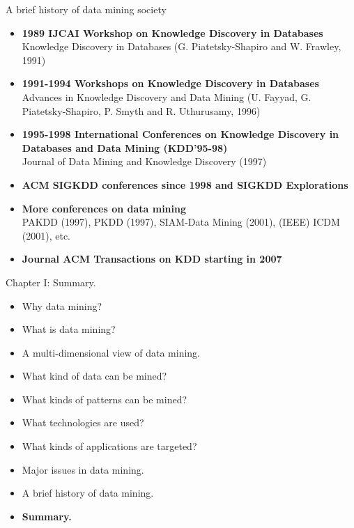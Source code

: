 \documentclass[aspectratio=169,t]{beamer}
\begin{document}
 { 
    \begin{frame}{A brief history of data mining society}
        \begin{itemize}
            \item \textbf{1989 IJCAI Workshop on Knowledge Discovery in Databases}\\
                  Knowledge Discovery in Databases (G. Piatetsky-Shapiro and W. Frawley, 1991)
            \item \textbf{1991-1994 Workshops on Knowledge Discovery in Databases}\\
                  Advances in Knowledge Discovery and Data Mining (U. Fayyad, G. Piatetsky-Shapiro, P. Smyth and R. Uthurusamy, 1996)
            \item \textbf{1995-1998 International Conferences on Knowledge Discovery in Databases and Data Mining (KDD’95-98)}\\
                  Journal of Data Mining and Knowledge Discovery (1997)
            \item \textbf{ACM SIGKDD conferences since 1998 and SIGKDD Explorations}\\
            \item \textbf{More conferences on data mining}\\
                  PAKDD (1997), PKDD (1997), SIAM-Data Mining (2001), (IEEE) ICDM (2001), etc.
            \item \textbf{Journal ACM Transactions on KDD starting in 2007}
        \end{itemize}
    \end{frame}
  }

 { 
    \begin{frame}{Chapter I: Summary.}
        \begin{itemize}
            \item Why data mining?
            \item What is data mining?
            \item A multi-dimensional view of data mining.
            \item What kind of data can be mined?
            \item What kinds of patterns can be mined?
            \item What technologies are used?
            \item What kinds of applications are targeted?
            \item Major issues in data mining.
            \item A brief history of data mining.
            \item \textbf{Summary.}
        \end{itemize}
    \end{frame}
  }
\end{document}
